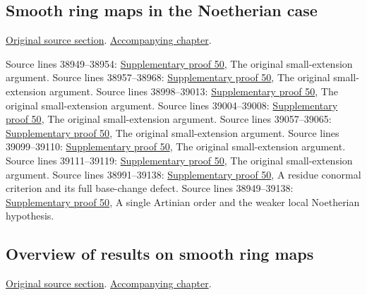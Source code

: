 \subsection{Smooth ring maps in the Noetherian case}
\hypertarget{algebra-source-section-smooth-Noetherian}{}
\noindent\href{https://github.com/stacks/stacks-project/blob/a04446e57ec1fbc252a871afcec7752fb2807b14/algebra.tex\#L38933}{Original source section}. \href{algebra.pdf\#nameddest=section-smooth-Noetherian}{Accompanying chapter}.

\begin{AlgebraSourceRoutes}
 Source lines 38949--38954: \hyperlink{algebra_smooth_artin_notes_20260928}{Supplementary proof 50}, The original small-extension argument.
 Source lines 38957--38968: \hyperlink{algebra_smooth_artin_notes_20260928}{Supplementary proof 50}, The original small-extension argument.
 Source lines 38998--39013: \hyperlink{algebra_smooth_artin_notes_20260928}{Supplementary proof 50}, The original small-extension argument.
 Source lines 39004--39008: \hyperlink{algebra_smooth_artin_notes_20260928}{Supplementary proof 50}, The original small-extension argument.
 Source lines 39057--39065: \hyperlink{algebra_smooth_artin_notes_20260928}{Supplementary proof 50}, The original small-extension argument.
 Source lines 39099--39110: \hyperlink{algebra_smooth_artin_notes_20260928}{Supplementary proof 50}, The original small-extension argument.
 Source lines 39111--39119: \hyperlink{algebra_smooth_artin_notes_20260928}{Supplementary proof 50}, The original small-extension argument.
 Source lines 38991--39138: \hyperlink{algebra_smooth_artin_notes_20260928}{Supplementary proof 50}, A residue conormal criterion and its full base-change defect.
 Source lines 38949--39138: \hyperlink{algebra_smooth_artin_notes_20260928}{Supplementary proof 50}, A single Artinian order and the weaker local Noetherian hypothesis.
\end{AlgebraSourceRoutes}

\subsection{Overview of results on smooth ring maps}
\hypertarget{algebra-source-section-smooth-overview}{}
\noindent\href{https://github.com/stacks/stacks-project/blob/a04446e57ec1fbc252a871afcec7752fb2807b14/algebra.tex\#L39148}{Original source section}. \href{algebra.pdf\#nameddest=section-smooth-overview}{Accompanying chapter}.

